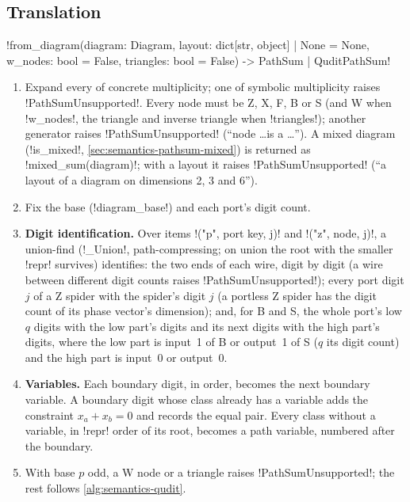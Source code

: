 \subsection{Translation}

\begin{signature}
\py!from_diagram(diagram: Diagram, layout: dict[str, object] | None = None, w_nodes: bool = False, triangles: bool = False) -> PathSum | QuditPathSum!
\end{signature}

\begin{algorithm}\label{alg:semantics-from-diagram}
\begin{enumerate}
\item Expand every \bbox{} of concrete multiplicity; one of symbolic multiplicity raises \py!PathSumUnsupported!. Every node must be Z, X, F, B or S (and W when \py!w_nodes!, the triangle and inverse triangle when \py!triangles!); another generator raises \py!PathSumUnsupported! (``node \ldots is a \ldots''). A mixed diagram (\py!is_mixed!, \cref{sec:semantics-pathsum-mixed}) is returned as \py!mixed_sum(diagram)!; with a layout it raises \py!PathSumUnsupported! (``a layout of a diagram on dimensions 2, 3 and 6'').
\item Fix the base (\py!diagram_base!) and each port's digit count.
\item \textbf{Digit identification.} Over items \code!("p", port key, j)! and \code!("z", node, j)!, a union-find (\py!_Union!, path-compressing; on union the root with the smaller \py!repr! survives) identifies: the two ends of each wire, digit by digit (a wire between different digit counts raises \py!PathSumUnsupported!); every port digit $j$ of a Z spider with the spider's digit $j$ (a portless Z spider has the digit count of its phase vector's dimension); and, for B and S, the whole port's low $q$ digits with the low part's digits and its next digits with the high part's digits, where the low part is input~1 of B or output~1 of S ($q$ its digit count) and the high part is input~0 or output~0.
\item \textbf{Variables.} Each boundary digit, in order, becomes the next boundary variable. A boundary digit whose class already has a variable adds the constraint $x_a+x_b=0$ and records the equal pair. Every class without a variable, in \py!repr! order of its root, becomes a path variable, numbered after the boundary.
\item With base $p$ odd, a W node or a triangle raises \py!PathSumUnsupported!; the rest follows \cref{alg:semantics-qudit}.

\end{enumerate}
\end{algorithm}
